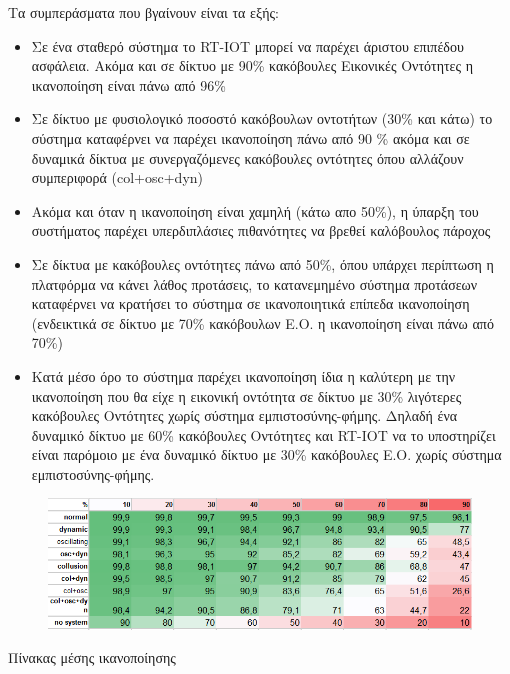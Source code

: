 Τα συμπεράσματα που βγαίνουν είναι τα εξής:

\begin{itemize}

\item Σε ένα σταθερό σύστημα το RT-IOT μπορεί να παρέχει άριστου επιπέδου ασφάλεια. Ακόμα και σε δίκτυο με 90\% κακόβουλες Εικονικές Οντότητες η ικανοποίηση είναι  πάνω από 96\%

\item Σε δίκτυο με φυσιολογικό ποσοστό κακόβουλων οντοτήτων (30\% και κάτω) το σύστημα καταφέρνει να παρέχει ικανοποίηση πάνω από 90 \% ακόμα και σε δυναμικά δίκτυα με συνεργαζόμενες κακόβουλες οντότητες όπου αλλάζουν συμπεριφορά (col+osc+dyn)

\item Ακόμα και όταν η ικανοποίηση είναι χαμηλή (κάτω απο 50\%), η ύπαρξη του συστήματος παρέχει υπερδιπλάσιες πιθανότητες να βρεθεί καλόβουλος πάροχος

\item Σε δίκτυα με κακόβουλες οντότητες πάνω από 50\%, όπου υπάρχει περίπτωση η πλατφόρμα να κάνει λάθος προτάσεις, το κατανεμημένο σύστημα προτάσεων καταφέρνει να κρατήσει το σύστημα σε ικανοποιητικά επίπεδα ικανοποίηση (ενδεικτικά σε δίκτυο με 70\% κακόβουλων Ε.Ο. η ικανοποίηση είναι πάνω από 70\%)

\item Κατά μέσο όρο το σύστημα παρέχει ικανοποίηση ίδια η καλύτερη με την ικανοποίηση που θα είχε η εικονική οντότητα σε δίκτυο με 30\% λιγότερες κακόβουλες Οντότητες χωρίς σύστημα εμπιστοσύνης-φήμης. Δηλαδή ένα δυναμικό δίκτυο με 60\% κακόβουλες Οντότητες και RT-IOT να το υποστηρίζει είναι παρόμοιο με ένα δυναμικό δίκτυο με 30\% κακόβουλες Ε.Ο. χωρίς σύστημα εμπιστοσύνης-φήμης.

\end{itemize}
\newpage
\begin{figure}[h!]
		\centering
		\includegraphics[scale={0.9}]
		{diagrams/table.PNG}
		\label{fig:table.PNG}
	\end{figure}
\begin{table}
\caption{Πίνακας μέσης ικανοποίησης}
\label{tab:avg_sat}
\end{table}

